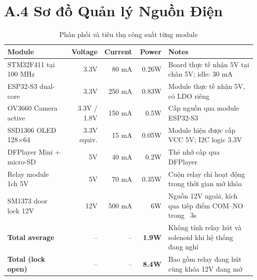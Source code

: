 \section*{A.4 \quad Sơ đồ Quản lý Nguồn Điện}

\begin{table}[H]
  \centering
  \small
  \caption{Phân phối và tiêu thụ công suất từng module}
  \label{tab:power_usage}
  \begin{tabularx}{0.9\textwidth}{l r r r Y}
    \toprule
    \textbf{Module} & \textbf{Voltage} & \textbf{Current} & \textbf{Power} & \textbf{Notes} \\
    \midrule
    STM32F411 tại 100 MHz & 3.3V & 80 mA & 0.26W & Board thực tế nhận 5V tại chân 5V; idle: 30 mA \\
    ESP32-S3 dual-core & 3.3V & 250 mA & 0.83W & Module thực tế nhận 5V, có LDO riêng \\
    OV3660 Camera active & 3.3V / 1.8V & 150 mA & 0.5W & Cấp nguồn qua module ESP32-S3 \\
    SSD1306 OLED 128×64 & 3.3V equiv. & 15 mA & 0.05W & Module hiện được cấp VCC 5V; I2C logic 3.3V \\
    DFPlayer Mini + micro-SD & 5V & 40 mA & 0.2W & Thẻ nhớ cấp qua DFPlayer \\
    Relay module 1ch 5V & 5V & 70 mA & 0.35W & Cuộn relay chỉ hoạt động trong thời gian mở khóa \\
    SM1373 door lock 12V & 12V & 500 mA & 6W & Nguồn 12V ngoài, kích qua tiếp điểm COM--NO trong ~3s \\
    \midrule
    \textbf{Total average} & -- & -- & \textbf{~1.9W} & Không tính relay hút và solenoid khi hệ thống đang nghỉ \\
    \textbf{Total (lock open)} & -- & -- & \textbf{~8.4W} & Bao gồm relay đang hút cùng khóa 12V đang mở \\
    \bottomrule
  \end{tabularx}
\end{table}
